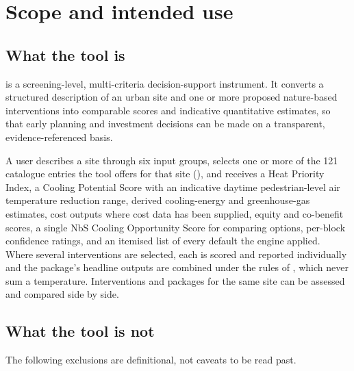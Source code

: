 \section{Scope and intended use}
\label{sec:scope}

\subsection{What the tool is}

\Tool{} is a screening-level, multi-criteria decision-support instrument. It
converts a structured description of an urban site and one or more proposed
nature-based interventions into comparable scores and indicative quantitative
estimates, so that early planning and investment decisions can be made on a
transparent, evidence-referenced basis.

A user describes a site through six input groups, selects one or more of the
\num{121} catalogue entries the tool offers for that site
(), and receives a Heat Priority Index, a Cooling
Potential Score with an indicative daytime pedestrian-level air temperature
reduction range, derived cooling-energy and greenhouse-gas estimates, cost
outputs where cost data has been supplied, equity and co-benefit scores, a
single NbS Cooling Opportunity Score for comparing options, per-block
confidence ratings, and an itemised list of every default the engine applied.
Where several interventions are selected, each is scored and reported
individually and the package's headline outputs are combined under the rules of
, which never sum a temperature. Interventions and packages
for the same site can be assessed and compared side by side.

\subsection{What the tool is not}
\label{sec:not}

The following exclusions are definitional, not caveats to be read past.

